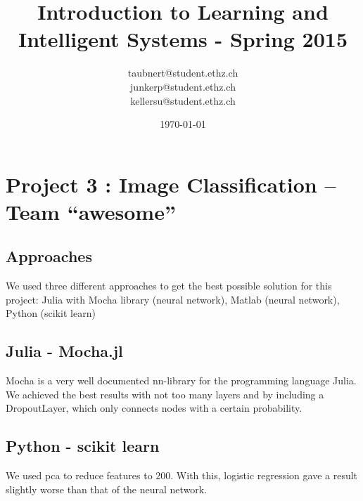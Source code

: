 \documentclass[a4paper, 11pt]{article}
\title{Introduction to Learning and Intelligent Systems - Spring 2015}
\author{taubnert@student.ethz.ch\\ junkerp@student.ethz.ch\\ kellersu@student.ethz.ch\\}
\date{\today}
\begin{document}
\maketitle

\section*{Project 3 : Image Classification -- Team ``awesome''}

\subsection{Approaches}
We used three different approaches to get the best possible solution for this project: Julia with Mocha library
(neural network), Matlab (neural network), Python (scikit learn)



\subsection{Julia - Mocha.jl}
Mocha is a very well documented nn-library for the programming language Julia. We achieved the best results with not
too many layers and by including a DropoutLayer, which only connects nodes with a certain probability.


\subsection{Python - scikit learn}
We used pca to reduce features to 200. With this, logistic regression gave a result slightly worse than that of the neural network.
\end{document}
